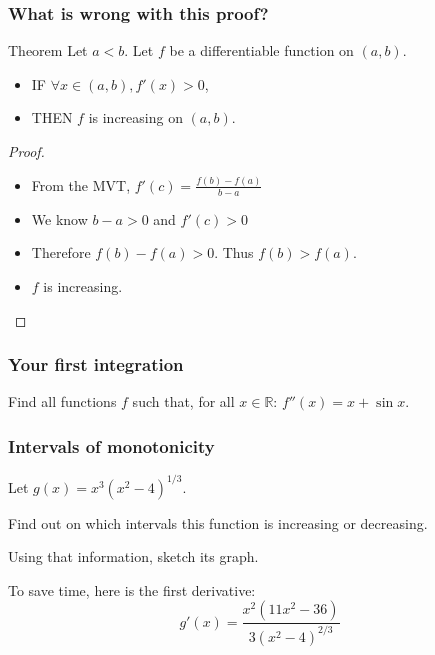 \documentclass[14pt]{beamer}
\begin{document}
	\begin{frame}[t]
		\frametitle{What is wrong with this proof?}

		\begin{block}{Theorem}
			Let $a < b$. Let $f$ be a differentiable function on $(a,b)$.
			\begin{itemize}
				\item IF $\forall x \in (a,b), f'(x) >0$,

				\item THEN $f$ is increasing on $(a,b)$.
			\end{itemize}
		\end{block}

		\begin{proof}
			\begin{itemize}
				\item From the MVT, $\displaystyle f'(c) = \frac{f(b) - f(a)}{b-a}$

				\item We know $\displaystyle b-a>0$ and $\displaystyle f'(c)>0$

				\item Therefore $\displaystyle f(b) - f(a)>0$. \quad Thus
					$\displaystyle f(b) > f(a)$.

				\item $f$ is increasing.
			\end{itemize}
		\end{proof}
	\end{frame}

	\begin{frame}[t]
		\frametitle{Your first integration}

		Find all functions $f$ such that, for all $\displaystyle x \in \mathbb{R}$:
		$\displaystyle f''(x) = x + \sin x$.
	\end{frame}


	\begin{frame}
		\frametitle{Intervals of monotonicity}

		Let $\displaystyle g(x) = x^{3}(x^{2}-4)^{1/3}.$

		Find out on which intervals this function is increasing or decreasing.

		Using that information, sketch its graph.

		To save time, here is the first derivative:
		\[
			g'(x) = \frac{x^{2}(11x^{2}-36)}{3(x^{2}-4)^{2/3}}
		\]
	\end{frame}
\end{document}
